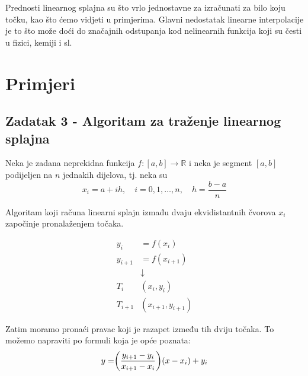 \documentclass[12pt,a4paper]{report}
\begin{document}
	Prednosti linearnog splajna su što vrlo jednostavne za izračunati za bilo koju točku, kao što ćemo vidjeti u primjerima. Glavni nedostatak linearne interpolacije je to što može doći do značajnih odstupanja kod nelinearnih funkcija koji su česti u fizici, kemiji i sl.
	\section{Primjeri}
		\subsection{Zadatak 3 - Algoritam za traženje linearnog splajna}
		Neka je zadana neprekidna funkcija $f:[a,b]\rightarrow \mathbb{R} $ i neka je segment $[a,b]$ podijeljen na $n$ jednakih dijelova, tj. neka su
		\begin{equation*}
			x_i=a+ih,\quad i=0,1,\ldots,n,\quad h=\frac{b-a}{n}
		\end{equation*}
		
		Algoritam koji računa linearni splajn izmađu dvaju ekvidistantnih čvorova $x_i$ započinje pronalaženjem točaka.
		
		\begin{align*}
			y_i&=f(x_i)\\
			y_{i+1}&=f(x_{i+1})\\
			&\downarrow\\
			T_i&(x_i, y_i)\\
			T_{i+1}&(x_{i+1}, y_{i+1})
		\end{align*}
		
		Zatim moramo pronaći pravac koji je razapet između tih dviju točaka. To možemo napraviti po formuli koja je opće poznata\cite{pmfPrezp5}:
		\begin{equation}
		y=\biggr{(}\frac{y_{i+1}-y_i}{x_{i+1}-x_i}\biggr{)}(x-x_i)+y_i
		\label{pravac}
		\end{equation}
		
		
\end{document}
